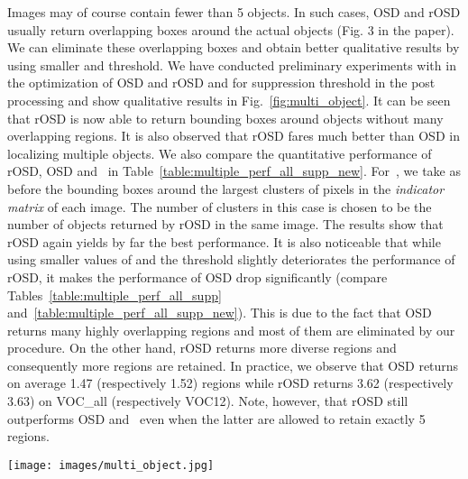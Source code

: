 \documentclass[runningheads]{llncs}
\begin{document}
Images may of course contain fewer than 5 objects. In such cases, OSD and rOSD usually return overlapping boxes around the actual objects (Fig. 3 in the paper). We can eliminate these overlapping boxes and obtain better qualitative results by using smaller  and  threshold. We have conducted preliminary experiments with  in the optimization of OSD and rOSD and  for suppression threshold in the post processing and show qualitative results in Fig.~\ref{fig:multi_object}. It can be seen that rOSD is now able to return bounding boxes around objects without many overlapping regions. It is also observed that rOSD fares much better than OSD in localizing multiple objects. We also compare the quantitative performance of rOSD, OSD and~\cite{Wei2019ddtplus} in Table~\ref{table:multiple_perf_all_supp_new}. For~\cite{Wei2019ddtplus}, we take as before the bounding boxes around the largest clusters of pixels in the \textit{indicator matrix} of each image. The number of clusters in this case is chosen to be the number of objects returned by rOSD in the same image. The results show that rOSD again yields by far the best performance. It is also noticeable that while using smaller values of  and the  threshold slightly deteriorates the performance of rOSD, it makes the performance of OSD drop significantly (compare Tables~\ref{table:multiple_perf_all_supp} and~\ref{table:multiple_perf_all_supp_new}). This is due to the fact that OSD returns many highly overlapping regions and most of them are eliminated by our procedure. On the other hand, rOSD returns more diverse regions and consequently more regions are retained. In practice, we observe that OSD returns on average 1.47 (respectively 1.52) regions while rOSD returns 3.62 (respectively 3.63) on VOC\_all (respectively VOC12). Note, however, that rOSD still outperforms OSD and~\cite{Wei2019ddtplus} even when the latter are allowed to retain exactly 5 regions.

\begin{figure*}
\centering
\parbox[t][][t]{\linewidth}{
\texttt{[image: images/multi\_object.jpg]}
}
\caption{\small Multi-object discovery results. In each column, from top to bottom: original image, image with predictions of OSD, image with predictions of rOSD. White boxes are ground truth objects and red ones are our predictions. There are \textit{at most} 5 predictions per image.}
\label{fig:multi_object}
\end{figure*}
\end{document}

